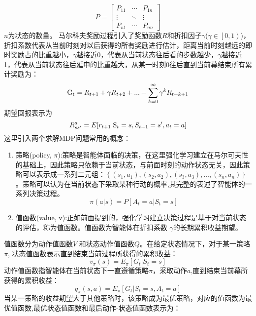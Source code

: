 \begin{equation}
P = \left[ {\begin{array}{*{20}{c}}
	{{P_{11}}}& \cdots &{{P_{1n}}}\\
	\vdots & \ddots & \vdots \\
	{{P_{n1}}}& \cdots &{{P_{nn}}}
	\end{array}} \right]
\end{equation}
$n$为状态的数量。
马尔科夫奖励过程引入了奖励函数$R$和折扣因子$\gamma$($\gamma  \in \left[ {0,1} \right)$)，折扣系数代表从当前时刻对以后获得的所有奖励进行估计，距离当前时刻越远的即时奖励占的比重越小，$\gamma$越接近0，代表从当前状态往后看的步数越少，$\gamma$越接近1，代表从当前状态往后延申的比重越大，从某一时刻$0$往后直到当前幕结束所有累计奖励为：
\begin{equation}
\label{eq:resthm}
{{\rm{G}}_{\rm{t}}} = {R_{t + 1}} + \gamma {R_{t + 2}} + ... + \sum\limits_{k = 0}^\infty  {{\gamma ^k}{R_{t + k + 1}}} 
\end{equation}
期望回报表示为
\begin{equation}
\label{eq:e}
R_{ss'}^a = E[{r_{t{\rm{ + }}1}}{\rm{|}}{{\rm{S}}_t} = s,{S_{t + 1}} = s',{a_t} = a]
\end{equation}
这里引入两个求解MDP问题常用的概念：
\begin{enumerate}
	\item 策略(policy, $ \pi $):策略是智能体面临的决策，在这里强化学习建立在马尔可夫性的基础上，因此策略只依赖于当前状态，与前面时刻的动作状态无关，因此策略可以表示成一系列二元组：$\left \{ \left ( s_{1},a_{1} \right ),\left ( s_{2},a_{2}\right ),\left ( s_{3},a_{3}\right ),\dots,\left ( s_{n},a_{n}\right )\right \}$。策略可以认为在当前状态下采取某种行动的概率,其完整的表述了智能体的一系列决策过程。
\begin{equation}
\label{eq:3}
\pi (a|s) = P[{A_t} = a|{S_t} = s]
\end{equation}
	\item 值函数(value, v):正如前面提到的，强化学习建立决策过程是基于对当前状态的评估，称为值函数。值函数为智能体在折扣系数 $\gamma$的长期累积收益期望。
\end{enumerate}

值函数分为动作值函数$V$ 和状态动作值函数$Q$。在给定状态情况下，对于某一策略 $\pi$, 状态值函数表示直到结束当前过程所获得的累积收益：
\begin{equation}
\label{eq:4}
{v_\pi }(s) = {E_\pi }[{G_t}|{S_t} = s]
\end{equation}
动作值函数指智能体在当前状态下一直遵循策略$ \pi $，采取动作$a$,直到结束当前幕所获得的累积收益：
\begin{equation}
\label{eq:5}
{q_\pi }(s,a) = {E_\pi }[{G_t}|{S_t} = s,{A_t} = a]
\end{equation}
当某一策略的收益期望大于其他策略时，该策略成为最优策略，对应的值函数为最优值函数,最优状态值函数和最后动作-状态值函数表示为：

